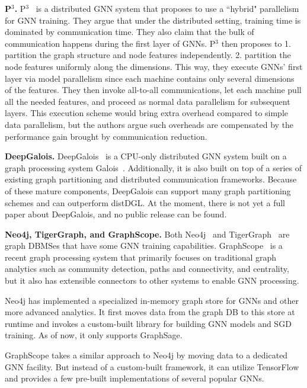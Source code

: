 \vspace{2mm}
\noindent \textbf{P$^{3}$.} P$^{3}$~\cite{pcube} is a distributed GNN system that proposes to use a ``hybrid" parallelism for GNN training. They argue that under the distributed setting, training time is dominated by communication time. They also claim that the bulk of communication happens during the first layer of GNNs. P$^{3}$ then proposes to 1. partition the graph structure and node features independently. 2. partition the node features uniformly along the dimensions. This way, they execute GNNs' first layer via model parallelism since each machine contains only several dimensions of the features. They then invoke all-to-all communications, let each machine pull all the needed features, and proceed as normal data parallelism for subsequent layers. This execution scheme would bring extra overhead compared to simple data parallelism, but the authors argue such overheads are compensated by the performance gain brought by communication reduction.



\vspace{2mm}
\noindent \textbf{DeepGalois.} 
DeepGalois~\cite{deepgalois} is a CPU-only distributed GNN system built on a graph processing system Galois~\cite{galois}. Additionally, it is also built on top of a series of existing graph partitioning and distributed communication frameworks. Because of these mature components, DeepGalois can support many graph partitioning schemes and can outperform distDGL. At the moment, there is not yet a full paper about DeepGalois, and no public release can be found.


\vspace{2mm}
\noindent \textbf{Neo4j, TigerGraph, and GraphScope.}
Both Neo4j~\cite{neo4j} and TigerGraph~\cite{tigergraph} are graph DBMSes that have some GNN training capabilities. GraphScope~\cite{graphscope} is a recent graph processing system that primarily focuses on traditional graph analytics such as community detection, paths and connectivity, and centrality, but it also has extensible connectors to other systems to enable GNN processing.

Neo4j has implemented a specialized in-memory graph store for GNNs and other more advanced analytics. It first moves data from the graph DB to this store at runtime and invokes a custom-built library for building GNN models and SGD training. As of now, it only supports GraphSage. 

GraphScope takes a similar approach to Neo4j by moving data to a dedicated GNN facility. But instead of a custom-built framework, it can utilize TensorFlow and provides a few pre-built implementations of several popular GNNs.

